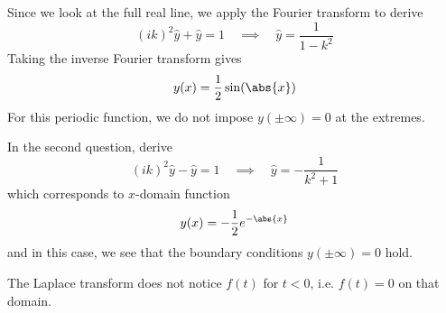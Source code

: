 \documentclass[a4paper]{article}
\begin{document}
\vspace{12pt}


Since we look at the full real line, we apply the Fourier transform to derive
\[
	\!\left( ik \right)^{2}\hat{y} + \hat{y} = 1 \quad \implies \quad \hat{y} = \frac{1}{1 - k^{2}}
\]
Taking the inverse Fourier transform gives
\[
	y \!\left( x \right) = \frac{1}{2}\sin\!\left(\abs{x}\right)  
\]
For this periodic function, we do not impose \( y \!\left( \pm \infty \right) = 0 \) at the extremes.

In the second question, derive
\[
	\!\left( ik \right)^{2}\hat{y} - \hat{y} = 1 \quad \implies \quad \hat{y} = -\frac{1}{k^{2} + 1} 
\]
which corresponds to \( x \)-domain function
\[
	y \!\left( x \right) = -\frac{1}{2}e^{-\abs{x}} 
\]
and in this case, we see that the boundary conditions \( y \!\left( \pm \infty \right) = 0 \) hold.

\vspace{12pt}


The Laplace transform does not notice \( f \!\left( t \right) \) for \( t < 0 \), i.e. \( f \!\left( t \right) = 0 \) on that domain.
\end{document}
